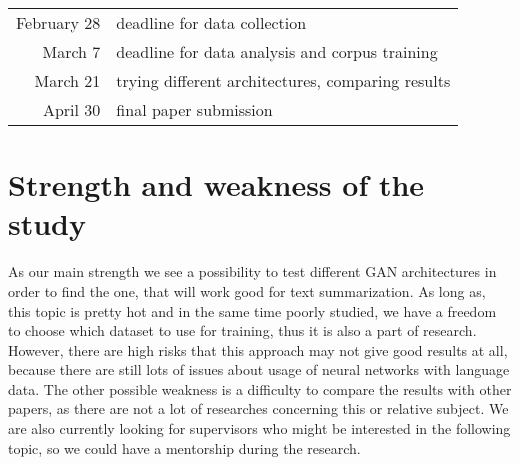 \documentclass[sigplan]{acmart}
\begin{document}
\begin{center}
\begin{tabular}{ r | l }
 February 28 & deadline for data collection \\ 
 March 7 & deadline for data analysis and corpus training \\  
 March 21 & trying different architectures, comparing results \\
 April 30 & final  paper submission
\end{tabular}
\end{center}

\section{Strength and weakness of the study}
As our main strength we see a possibility to test different GAN architectures in order to find the one, that will work good for text summarization. As long as, this topic is pretty hot and in the same time poorly studied, we have a freedom to choose which dataset to use for training, thus it is also a part of research. 
However, there are high risks that this approach may not give good results at all, because there are still lots of issues about  usage of neural networks with language data. The other possible weakness is a difficulty to compare the results with other papers, as there are not a lot of researches concerning this or relative subject. 
We are also currently looking for supervisors who might be interested in the following topic, so we could have a mentorship during the research.



\end{document}
